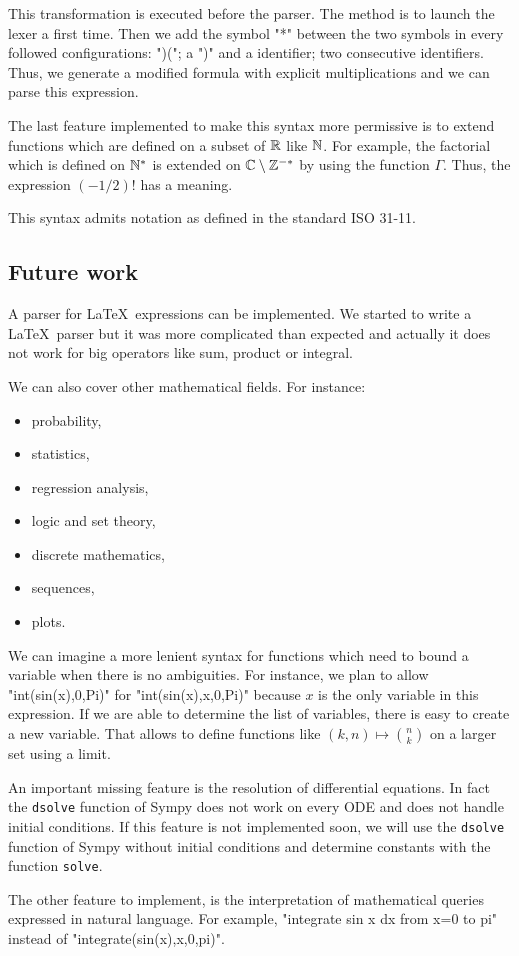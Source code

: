 This transformation is executed before the parser. The method is to launch the lexer a first time. Then we add the symbol "*" between the two symbols in every followed configurations: ")("; a ")" and a identifier; two consecutive identifiers. Thus, we generate a modified formula with explicit multiplications and we can parse this expression.

The last feature implemented to make this syntax more permissive is to extend functions which are defined on a subset of $\mathbb{R}$ like $\mathbb{N}$. For example, the factorial which is defined on $\mathbb{N}^*$ is extended on $\mathbb{C}\setminus \mathbb{Z}^{-*}$ by using the function $\Gamma$. Thus, the expression $(-1/2)!$ has a meaning.

This syntax admits notation as defined in the standard ISO 31-11.

\subsection{Future work}

A parser for \LaTeX \ expressions can be implemented. We started to write a \LaTeX \ parser but it was more complicated than expected and actually it does not work for big operators like sum, product or integral.

We can also cover other mathematical fields. For instance:
\begin{itemize}
    \item probability,
    \item statistics,
    \item regression analysis,
    \item logic and set theory,
    \item discrete mathematics,
    \item sequences,
    \item plots.
\end{itemize}

We can imagine a more lenient syntax for functions which need to bound a variable when there is no ambiguities. For instance, we plan to allow "int(sin(x),0,Pi)" for "int(sin(x),x,0,Pi)" because $x$ is the only variable in this expression. If we are able to determine the list of variables, there is easy to create a new variable. That allows to define functions like $(k,n)\mapsto \binom{n}{k}$ on a larger set using a limit.

An important missing feature is the resolution of differential equations. In fact the \texttt{dsolve} function of Sympy does not work on every ODE and does not handle initial conditions. If this feature is not implemented soon, we will use the \texttt{dsolve} function of Sympy without initial conditions and determine constants with the function \texttt{solve}.

The other feature to implement, is the interpretation of mathematical queries expressed in natural language. For example, "integrate sin x dx from x=0 to pi" instead of "integrate(sin(x),x,0,pi)".
